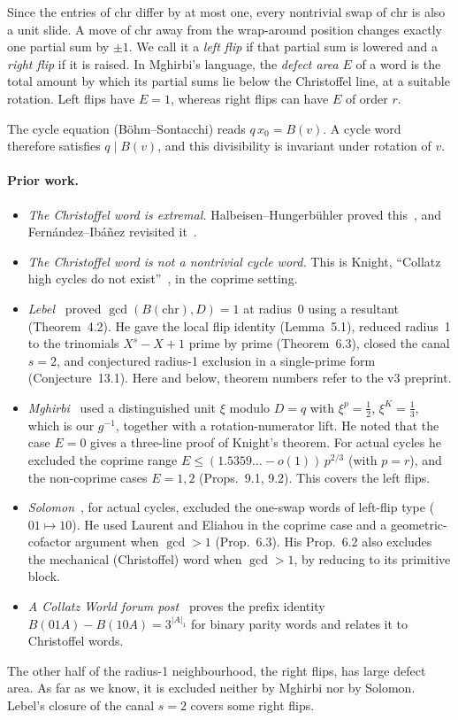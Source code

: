 \documentclass[11pt]{article}
\theoremstyle{plain}
\theoremstyle{definition}
\theoremstyle{remark}
\newcommand{\chr}{\mathrm{chr}}
\begin{document}
Since the entries of $\chr$ differ by at most one, every nontrivial swap of $\chr$ is also a unit
slide. A move of $\chr$ away from the wrap-around position changes exactly one partial sum by
$\pm1$. We call it a \emph{left flip} if that partial sum is lowered and a \emph{right flip} if
it is raised. In Mghirbi's language, the \emph{defect area} $E$ of a word is the total amount by
which its partial sums lie below the Christoffel line, at a suitable rotation. Left flips have
$E=1$, whereas right flips can have $E$ of order $r$.

The cycle equation (Böhm--Sontacchi) reads $q\,x_0=B(v)$. A cycle word therefore satisfies
$q\mid B(v)$, and this divisibility is invariant under rotation of $v$.

\paragraph{Prior work.}
\begin{itemize}
  \item \emph{The Christoffel word is extremal.} Halbeisen--Hungerbühler proved this~\cite{HH},
        and Fernández--Ibáñez revisited it~\cite{FI}.
  \item \emph{The Christoffel word is not a nontrivial cycle word.} This is Knight, ``Collatz
        high cycles do not exist''~\cite{Knight}, in the coprime setting.
  \item \emph{Lebel}~\cite{Lebel} proved $\gcd(B(\chr),D)=1$ at radius~0 using a resultant
        (Theorem~4.2). He gave the local flip identity (Lemma~5.1), reduced radius~1 to the
        trinomials $X^s-X+1$ prime by prime (Theorem~6.3), closed the canal $s=2$, and
        conjectured radius-1 exclusion in a single-prime form (Conjecture~13.1). Here and
        below, theorem numbers refer to the v3 preprint.
  \item \emph{Mghirbi}~\cite{Mghirbi} used a distinguished unit $\xi$ modulo $D=q$ with
        $\xi^p=\tfrac12$, $\xi^K=\tfrac13$, which is our $g^{-1}$, together with a
        rotation-numerator lift. He noted that the case $E=0$ gives a three-line proof of
        Knight's theorem. For actual cycles he excluded the coprime range
        $E\le(1.5359\ldots-o(1))\,p^{2/3}$ (with $p=r$), and the non-coprime cases $E=1,2$
        (Props.~9.1, 9.2). This covers the left flips.
  \item \emph{Solomon}~\cite{Solomon}, for actual cycles, excluded the one-swap words of left-flip
        type ($01\mapsto10$). He used Laurent and Eliahou in the coprime case and a
        geometric-cofactor argument when $\gcd>1$ (Prop.~6.3). His Prop.~6.2 also excludes the
        mechanical (Christoffel) word when $\gcd>1$, by reducing to its primitive block.
  \item \emph{A Collatz World forum post}~\cite{CW} proves the prefix identity
        $B(01A)-B(10A)=3^{|A|_1}$ for binary parity words and relates it to Christoffel words.
\end{itemize}
The other half of the radius-1 neighbourhood, the right flips, has large defect area. As far as
we know, it is excluded neither by Mghirbi nor by Solomon. Lebel's closure of the canal $s=2$
covers some right flips.
\end{document}
